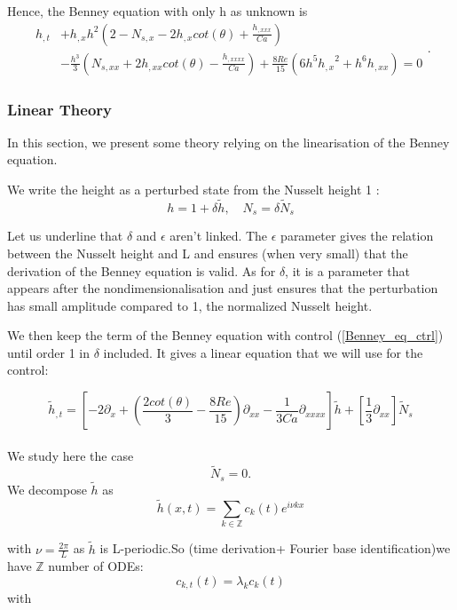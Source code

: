 \documentclass[12pt]{article}
\begin{document}
Hence, the Benney equation with only h as unknown is 
\begin{equation}\label{Benney_eq_ctrl}
\boxed{
\begin{aligned}
    h_{,t} &+ h_{,x}h^2 \left( 2-N_{s, x}-2h_{,x}cot(\theta) + \frac{h_{,xxx}}{Ca}\right) \\ &- \frac{h^3}{3}\left(N_{s, xx} + 2h_{,xx}cot(\theta)  - \frac{h_{,xxxx}}{Ca} \right)
    + \frac{8Re}{15} \left( 6h^5 {h_{,x}}^2 + h^6 h_{,xx} \right) = 0
\end{aligned}
}.
\end{equation}

\subsubsection{Linear Theory}\label{subsubsection_linear_theory}
In this section, we present some theory relying on the linearisation of the Benney equation. 

We write the height as a perturbed state from the Nusselt height 1 : 
\begin{equation}\label{h_linear_decomposition}
    h = 1+\delta \tilde{h},\quad N_s = \delta \tilde{N}_s
\end{equation}

Let us underline that $\delta$ and $\epsilon$ aren't linked. The $\epsilon$ parameter gives the relation between the Nusselt height and L and ensures (when very small) that the derivation of the Benney equation is valid. As for $\delta$, it is a parameter that appears after the nondimensionalisation and just ensures that the perturbation has small amplitude compared to 1, the normalized Nusselt height. 

We then keep the term of the Benney equation with control (\ref{Benney_eq_ctrl}) until order 1 in $\delta$ included. It gives a linear equation that we will use for the control:

\begin{equation}\label{Benney_ctrl_linearised}
    \tilde{h}_{,t} = \left[ -2\partial_x + (\frac{2cot(\theta)}{3}-\frac{8Re}{15})\partial_{xx} - \frac{1}{3Ca}\partial_{xxxx}\right]\tilde{h} + \left[ \frac{1}{3}\partial_{xx}\right]\tilde{N}_s
\end{equation}
\\
We study here the case $$\tilde{N}_s = 0.$$
We decompose $\tilde{h}$ as $$\tilde{h}(x,t) = \sum_{k\in\mathbb{Z}}c_k(t)e^{i\nu kx}$$

with $\nu =\frac{2\pi}{L}$ as $\tilde{h}$ is L-periodic.So (time derivation+ Fourier base identification)we have $\mathbb{Z}$ number of ODEs: 
\begin{equation}\label{Fourier_mode}
    c_{k, t}(t) = \lambda_k c_k(t)
\end{equation}
with 
\end{document}

